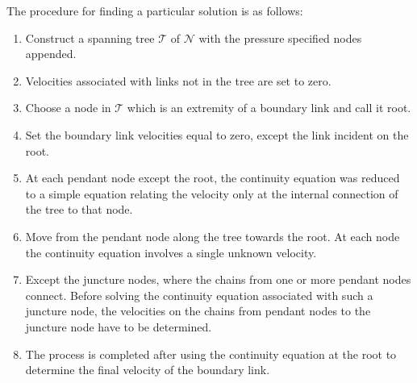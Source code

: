 \documentclass{article}
\begin{document}
The procedure for finding a particular solution is as follows:
\begin{enumerate}
	\item Construct a spanning tree $\mathcal{T}$ of $\mathcal{N}$ with the pressure specified nodes appended.
	\item Velocities associated with links not in the tree are set to zero.
	\item Choose a node in $\mathcal{T}$ which is an extremity of a boundary link and call it root. 
	\item Set the boundary link velocities equal to zero, except the link incident on the root.
	\item At each pendant node except the root, the continuity equation was reduced to a simple equation relating the velocity only at the internal connection of the tree to that node.  
	\item Move from the pendant node along the tree towards the root. At each node the continuity equation involves a single unknown velocity.
	\item Except the juncture nodes, where the chains from one or more pendant nodes connect. Before solving the continuity equation associated with such a juncture node, the velocities on the chains from pendant nodes to the juncture node have to be determined.
	\item The process is completed after using the continuity equation at the root to determine the final velocity of the boundary link.
\end{enumerate}

\end{document}
